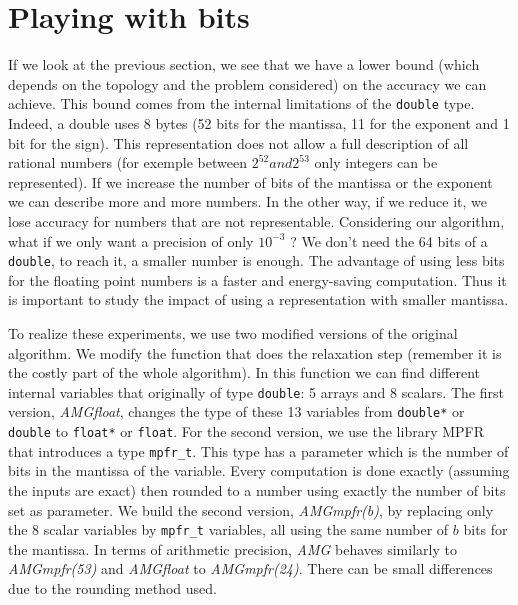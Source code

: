 \documentclass[a4paper,10pt]{article}
\begin{document}
   \section{Playing with bits}
   
   If we look at the previous section, we see that we have a lower bound (which depends on the topology and the problem considered) on the accuracy we can achieve. This bound comes from the internal limitations of the \texttt{double} type.
   Indeed, a double uses 8 bytes (52 bits for the mantissa, 11 for the exponent and 1 bit for the sign). This representation does not allow a full description of all rational numbers (for exemple between $2^{52} and 2^{53}$ only integers can be represented).
   If we increase the number of bits of the mantissa or the exponent we can describe more and more numbers. In the other way, if we reduce it, we lose accuracy for numbers that are not representable. Considering our algorithm, what if we only want
   a precision of only $10^{-3}$ ? We don't need the 64 bits of a \texttt{double}, to reach it, a smaller number is enough. The advantage of using less bits for the floating point numbers is a faster and energy-saving computation. Thus it is important
   to study the impact of using a representation with smaller mantissa.
   
   To realize these experiments, we use two modified versions of the original algorithm. We modify the function that does the relaxation step (remember it is the costly part of the whole algorithm).
   In this function we can find different internal variables that originally of type \texttt{double}: 5 arrays and 8 scalars. The first version, \emph{AMGfloat}, changes the type of these 13 variables from \texttt{double*} or \texttt{double}
   to \texttt{float*} or \texttt{float}. For the second version, we use the library MPFR~\cite{MPFR,MPFR_link} that introduces a type \texttt{mpfr\_t}. This type has a parameter which is the number of bits in the mantissa of the variable.
   Every computation is done exactly (assuming the inputs are exact) then rounded to a number using exactly the number of bits set as parameter. We build the second version, \emph{AMGmpfr(b)}, by replacing only the 8 scalar variables
   by \texttt{mpfr\_t} variables, all using the same number of $b$ bits for the mantissa. In terms of arithmetic precision, \emph{AMG} behaves similarly to \emph{AMGmpfr(53)} and \emph{AMGfloat} to \emph{AMGmpfr(24)}. There can be small differences
   due to the rounding method used.
   
\end{document}
